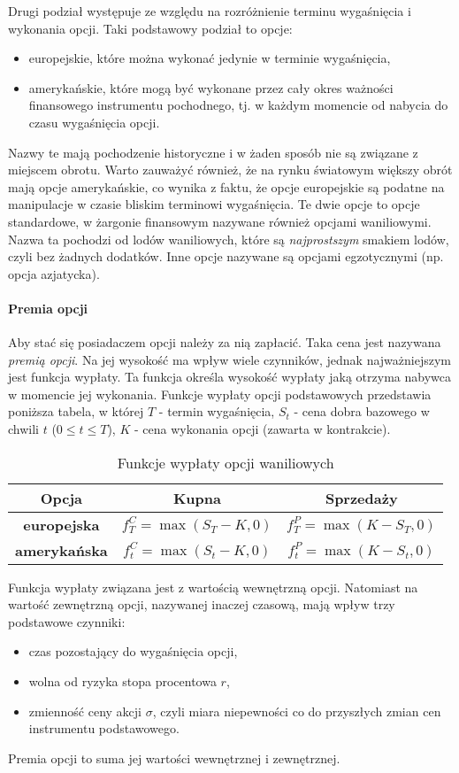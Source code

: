 \documentclass[12pt]{article}
\begin{document}
\noindent Drugi podział występuje ze względu na rozróżnienie terminu wygaśnięcia i wykonania opcji. Taki podstawowy podział to opcje:
\begin{itemize}
\item europejskie, które można wykonać jedynie w terminie wygaśnięcia,
\item amerykańskie, które mogą być wykonane przez cały okres ważności finansowego instrumentu pochodnego, tj. w każdym momencie od nabycia do czasu wygaśnięcia opcji.
\end{itemize}
Nazwy te mają pochodzenie historyczne i w żaden sposób nie są związane z miejscem obrotu. Warto zauważyć również, że na rynku światowym większy obrót mają opcje amerykańskie, co wynika z faktu, że opcje europejskie są podatne na manipulacje w czasie bliskim terminowi wygaśnięcia. Te dwie opcje to opcje standardowe, w żargonie finansowym nazywane również opcjami waniliowymi. Nazwa ta pochodzi od lodów waniliowych, które są \textit{najprostszym} smakiem lodów, czyli bez żadnych dodatków. Inne opcje nazywane są opcjami egzotycznymi (np. opcja azjatycka).

\paragraph{Premia opcji} Aby stać się posiadaczem opcji należy za nią zapłacić. Taka cena jest nazywana \textit{premią opcji}. Na jej wysokość ma wpływ wiele czynników, jednak najważniejszym jest funkcja wypłaty. Ta funkcja określa wysokość wypłaty jaką otrzyma nabywca w momencie jej wykonania. Funkcje wypłaty opcji podstawowych przedstawia poniższa tabela, w której $T$ - termin wygaśnięcia, $S_t$ - cena dobra bazowego w chwili $t$ ($0 \leq t \leq T$), $K$ - cena wykonania opcji (zawarta w kontrakcie).

\begin{table}[ht]
\caption{Funkcje wypłaty opcji waniliowych}
\centering
\begin{tabular}{|c|c|c|}
\hline                       
\textbf{Opcja} & \textbf{Kupna} & \textbf{Sprzedaży}\\
\hline 
\textbf{europejska} & $f_T^C = \max(S_T-K,0)$ & $f_T^P = \max(K-S_T,0)$  \\[1ex]
\textbf{amerykańska} & $f_t^C = \max(S_t-K,0)$ & $f_t^P = \max(K-S_t,0)$  \\[1ex]  
\hline 
\end{tabular}
\label{tab:wyplata} 
\end{table}
\noindent Funkcja wypłaty związana jest z wartością wewnętrzną opcji. Natomiast na wartość zewnętrzną opcji, nazywanej inaczej czasową, mają wpływ trzy podstawowe czynniki:
\begin{itemize}
\item czas pozostający do wygaśnięcia opcji,
\item wolna od ryzyka stopa procentowa $r$,
\item zmienność ceny akcji $\sigma$, czyli miara niepewności co do przyszłych zmian cen instrumentu podstawowego.
\end{itemize}
Premia opcji to suma jej wartości wewnętrznej i zewnętrznej.
\end{document}
